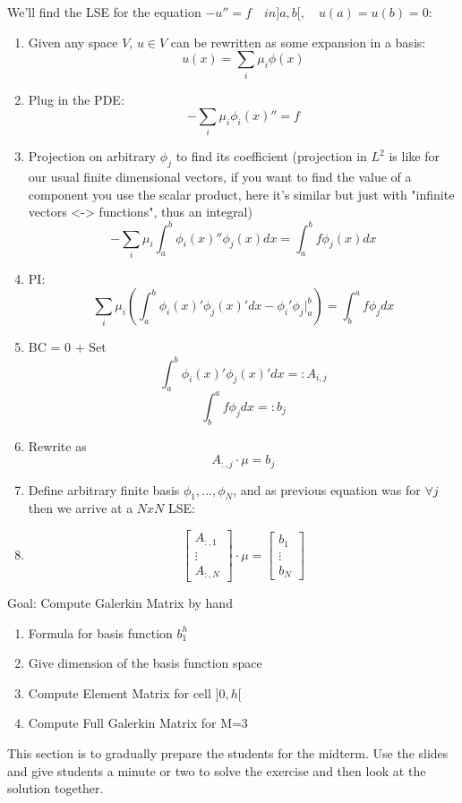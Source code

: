 We'll find the LSE for the equation $-u'' = f \quad in ]a,b[, \quad u(a)=u(b)=0$:
\begin{enumerate}
    \item Given any space $V$, $u \in V$ can be rewritten as some expansion in a basis:
    $$ u(x) = \sum_i \mu_i \phi(x)$$
    \item Plug in the PDE:
    $$ - \sum_i \mu_i \phi_i(x)'' = f$$
    \item Projection on arbitrary $\phi_j$ to find its coefficient (projection in $L^2$ is like for our usual finite dimensional vectors, if you want to find the value of a component you use the scalar product, here it's similar but just with "infinite vectors <-> functions", thus an integral)
    $$ - \sum_i \mu_i \int_a^b \phi_i(x)''\phi_j(x) dx = \int_a^b f \phi_j(x) dx $$
    \item PI:
    $$ \sum_i \mu_i (\int_a^b \phi_i(x)'\phi_j(x)'dx - \phi_i'\phi_j |_a^b) = \int_b^a f\phi_j dx$$
    \item BC = 0 + Set $$\int_a^b \phi_i(x)'\phi_j(x)'dx =: A_{i,j}$$ $$\int_b^a f\phi_j dx =: b_j $$
    \item Rewrite as $$A_{:,j} \cdot \mu = b_j$$
    \item Define arbitrary finite basis ${\phi_1, ..., \phi_N}$, and as previous equation was for $\forall j$ then we arrive at a $NxN$ LSE:
    \item $$
    \begin{bmatrix}
    A_{:,1} \\
    \vdots \\
    A_{:, N}
    \end{bmatrix} \cdot \mu =
    \begin{bmatrix}
        b_1 \\
        \vdots \\
        b_N
    \end{bmatrix}
    $$
\end{enumerate}



Goal: Compute Galerkin Matrix by hand
\begin{enumerate}
    \item Formula for basis function $b^h_1$
    
    \item Give dimension of the basis function space
    \item Compute Element Matrix for cell $]0,h[$
    \item Compute Full Galerkin Matrix for M=3
\end{enumerate}


 This section is to gradually prepare the students for the midterm. Use the slides and give students a minute or two to solve the exercise and then look at the solution together.

 

 




